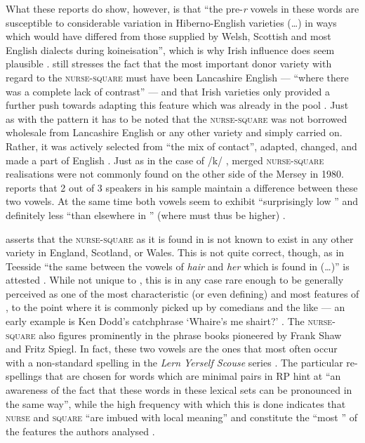 What these reports do show, however, is that ``the pre-\emph{r} vowels in these words are susceptible to considerable variation in Hiberno-English varieties (\ldots) in ways which would have differed from those supplied by Welsh, Scottish and most English dialects during koineisation'', which is why Irish influence does seem plausible \citep[128]{honeybone2007}.
\citeauthor{honeybone2007} still stresses the fact that the most important donor variety with regard to the \textsc{nurse}-\textsc{square}  must have been Lancashire English --- ``where there was a complete lack of contrast'' --- and that Irish varieties only provided a further push towards adapting this feature which was already in the pool \citep[129]{honeybone2007}.
Just as with the   pattern it has to be noted that the \textsc{nurse}-\textsc{square}  was not borrowed wholesale from Lancashire English or any other variety and simply carried on. 
Rather, it was actively selected from ``the mix of  contact'', adapted, changed, and made a part of  English \citeyearpar[cf.][129]{honeybone2007}.
Just as in the case of /k/ , merged \textsc{nurse}-\textsc{square} realisations were not commonly found on the other side of the Mersey in 1980.
\textcite[95]{newbrook1999} reports that 2 out of 3 speakers in his sample maintain a difference between these two vowels.
At the same time both vowels seem to exhibit ``surprisingly low '' and definitely less ``than elsewhere in '' (where  must thus be higher) \parencite[95]{newbrook1999}.

\citet[cf.][128]{honeybone2007} asserts that the \textsc{nurse}-\textsc{square}  as it is found in  is not known to exist in any other variety in England, Scotland, or Wales.
This is not quite correct, though, as in Teesside ``the same  between the vowels of \emph{hair} and \emph{her} which is found in  (\dots)'' is attested \parencite[70]{trudgill1999}.
While not unique to , this  is in any case rare enough to be generally perceived as one of the most characteristic (or even defining) and most  features of , to the point where it is commonly picked up by comedians and the like --- an early example is Ken Dodd's catchphrase `Whaire's me shairt?' \citep[cf.][73]{trudgill1999}.
The \textsc{nurse}-\textsc{square}  also figures prominently in the  phrase books pioneered by Frank Shaw and Fritz Spiegl.
In fact, these two vowels are the ones that most often occur with a non-standard spelling in the \emph{Lern Yerself Scouse} series \parencite[cf.][322]{honeybonewatson2013}.
The particular re-spellings that are chosen for words which are minimal pairs in RP hint at ``an awareness of the fact that these words in these lexical sets can be pronounced in the same way'', while the high frequency with which this is done indicates that \textsc{nurse} and \textsc{square} ``are imbued with local meaning'' and constitute the ``most '' of the  features the authors analysed \parencite[324]{honeybonewatson2013}.

